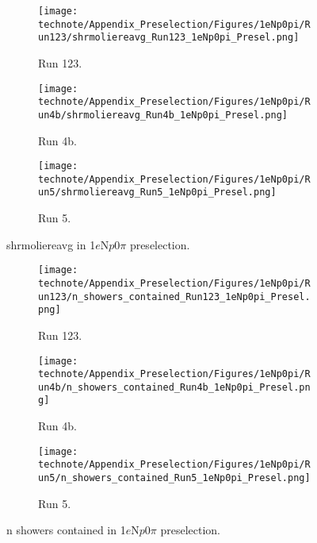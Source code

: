 \begin{figure}[H]
    \centering
    \begin{subfigure}[t]{0.32\linewidth}
        \texttt{[image: technote/Appendix\_Preselection/Figures/1eNp0pi/Run123/shrmoliereavg\_Run123\_1eNp0pi\_Presel.png]}
        \caption{Run 123.}
    \end{subfigure}%
    \hspace{0.2cm}%
    \begin{subfigure}[t]{0.32\linewidth}
        \texttt{[image: technote/Appendix\_Preselection/Figures/1eNp0pi/Run4b/shrmoliereavg\_Run4b\_1eNp0pi\_Presel.png]}
        \caption{Run 4b.}
    \end{subfigure}%
    \hspace{0.2cm}%
    \begin{subfigure}[t]{0.32\linewidth}
        \texttt{[image: technote/Appendix\_Preselection/Figures/1eNp0pi/Run5/shrmoliereavg\_Run5\_1eNp0pi\_Presel.png]}
        \caption{Run 5.}
    \end{subfigure}
    \caption{shrmoliereavg in 1$e$N$p$0$\pi$ preselection.}
\end{figure}

\begin{figure}[H]
    \centering
    \begin{subfigure}[t]{0.32\linewidth}
        \texttt{[image: technote/Appendix\_Preselection/Figures/1eNp0pi/Run123/n\_showers\_contained\_Run123\_1eNp0pi\_Presel.png]}
        \caption{Run 123.}
    \end{subfigure}%
    \hspace{0.2cm}%
    \begin{subfigure}[t]{0.32\linewidth}
        \texttt{[image: technote/Appendix\_Preselection/Figures/1eNp0pi/Run4b/n\_showers\_contained\_Run4b\_1eNp0pi\_Presel.png]}
        \caption{Run 4b.}
    \end{subfigure}%
    \hspace{0.2cm}%
    \begin{subfigure}[t]{0.32\linewidth}
        \texttt{[image: technote/Appendix\_Preselection/Figures/1eNp0pi/Run5/n\_showers\_contained\_Run5\_1eNp0pi\_Presel.png]}
        \caption{Run 5.}
    \end{subfigure}
    \caption{n showers contained in 1$e$N$p$0$\pi$ preselection.}
\end{figure}

